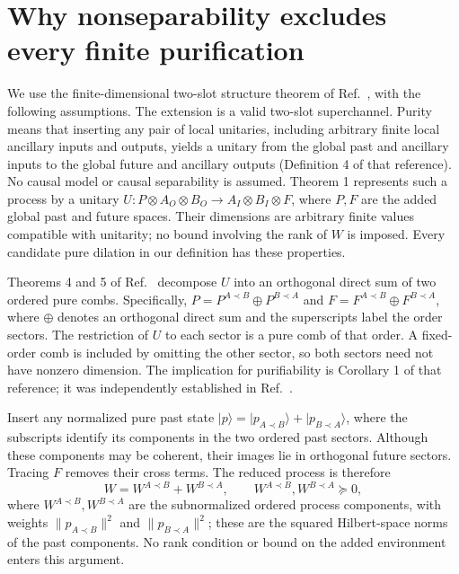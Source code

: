 \documentclass[11pt]{article}
\begin{document}
\section{Why nonseparability excludes every finite purification}
We use the finite-dimensional two-slot structure theorem of Ref.~\cite{Yokojima}, with the following assumptions. The extension is a valid two-slot superchannel. Purity means that inserting any pair of local unitaries, including arbitrary finite local ancillary inputs and outputs, yields a unitary from the global past and ancillary inputs to the global future and ancillary outputs (Definition 4 of that reference). No causal model or causal separability is assumed. Theorem 1 represents such a process by a unitary $U:P\otimes A_O\otimes B_O\to A_I\otimes B_I\otimes F$, where $P,F$ are the added global past and future spaces. Their dimensions are arbitrary finite values compatible with unitarity; no bound involving the rank of $W$ is imposed. Every candidate pure dilation in our definition has these properties.

Theorems 4 and 5 of Ref.~\cite{Yokojima} decompose $U$ into an orthogonal direct sum of two ordered pure combs. Specifically, $P=P^{A\prec B}\oplus P^{B\prec A}$ and $F=F^{A\prec B}\oplus F^{B\prec A}$, where $\oplus$ denotes an orthogonal direct sum and the superscripts label the order sectors. The restriction of $U$ to each sector is a pure comb of that order. A fixed-order comb is included by omitting the other sector, so both sectors need not have nonzero dimension. The implication for purifiability is Corollary 1 of that reference; it was independently established in Ref.~\cite{Cyclic}.

Insert any normalized pure past state $|p\rangle=|p_{A\prec B}\rangle+|p_{B\prec A}\rangle$, where the subscripts identify its components in the two ordered past sectors. Although these components may be coherent, their images lie in orthogonal future sectors. Tracing $F$ removes their cross terms. The reduced process is therefore
\begin{equation}
 W=W^{A\prec B}+W^{B\prec A},\qquad
 W^{A\prec B},W^{B\prec A}\succeq0,
 \label{eq:pure-to-CS}
\end{equation}
where $W^{A\prec B},W^{B\prec A}$ are the subnormalized ordered process components, with weights $\|p_{A\prec B}\|^2$ and $\|p_{B\prec A}\|^2$; these are the squared Hilbert-space norms of the past components. No rank condition or bound on the added environment enters this argument.
\end{document}
